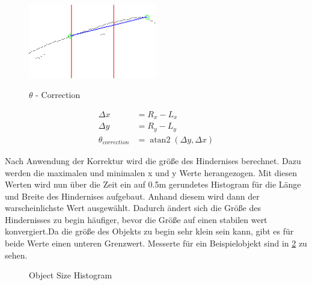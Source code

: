 \documentclass[11pt,oneside,openright]{mpreport}
\DeclareMathOperator{\atantwo}{atan2}
\begin{document}
\begin{figure}[!ht]
\caption{$\theta$ - Correction}
\includegraphics[width=0.5\textwidth]{bilder/obst_devide_angle.png}
\label{obst_correction}
\end{figure}

\begin{align*}
\Delta x &= R_x - L_x\\
\Delta y &= R_y - L_y\\
\theta_{correction} &= \atantwo(\Delta y,\Delta x)
\end{align*}

Nach Anwendung der Korrektur wird die größe des Hindernises berechnet. Dazu werden die maximalen und minimalen x und y Werte herangezogen.
Mit diesen Werten wird nun über die Zeit ein auf 0.5m gerundetes Histogram für die Länge und Breite des Hindernises aufgebaut.
Anhand diesem wird dann der warscheinlichste Wert ausgewählt. Dadurch ändert sich die Größe des Hindernisses zu begin häufiger,
bevor die Größe auf einen stabilen wert konvergiert.Da die größe des Objekts zu begin sehr klein sein kann, 
gibt es für beide Werte einen unteren Grenzwert. Messerte für ein Beispielobjekt sind in \cref{obst_hist} zu sehen.
\begin{figure}[!ht]
\caption{Object Size Histogram}
\label{obst_hist}
\end{figure}
\end{document}
